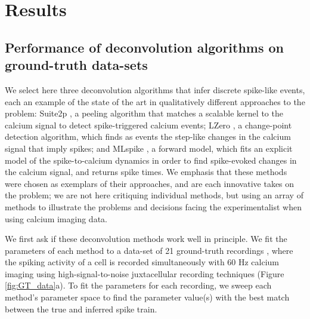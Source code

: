 \documentclass[a4paper,11pt]{article}
\begin{document}
\section{Results} 
\subsection{Performance of deconvolution algorithms on ground-truth data-sets}\label{GT}
We select here three deconvolution algorithms that infer discrete spike-like events, each an example of the state of the art in qualitatively different approaches to the problem: Suite2p \citep{Pachitariu2016-ui}, a peeling algorithm that matches a scalable kernel to the calcium signal to detect spike-triggered calcium events; LZero \citep{Jewell2018-cx}, a change-point detection algorithm, which finds as events the step-like changes in the calcium signal that imply spikes; and MLspike \citep{Deneux2016-gu}, a forward model, which fits an explicit model of the spike-to-calcium dynamics in order to find spike-evoked changes in the calcium signal, and returns spike times. We emphasis that these methods were chosen as exemplars of their approaches, and are each innovative takes on the problem; we are not here critiquing individual methods, but using an array of methods to illustrate the problems and decisions facing the experimentalist when using calcium imaging data.

We first ask if these deconvolution methods work well in principle. We fit the parameters of each method to a data-set of 21 ground-truth recordings \citep{Chen2013-nv}, where the spiking activity of a cell is recorded simultaneously with 60 Hz calcium imaging using high-signal-to-noise juxtacellular recording techniques (Figure \ref{fig:GT_data}a). To fit the parameters for each recording, we sweep each method's parameter space to find the parameter value(s) with the best match between the true and inferred spike train. 
\end{document}
